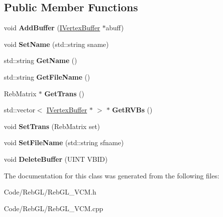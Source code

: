 \subsection*{Public Member Functions}
\begin{DoxyCompactItemize}
\item 
void {\bfseries Add\+Buffer} (\hyperlink{class_i_vertex_buffer}{I\+Vertex\+Buffer} $\ast$abuff)\hypertarget{class_reb_g_l_vertex_cache_a686314c5aea4532365f33ec4d9fef315}{}\label{class_reb_g_l_vertex_cache_a686314c5aea4532365f33ec4d9fef315}

\item 
void {\bfseries Set\+Name} (std\+::string sname)\hypertarget{class_reb_g_l_vertex_cache_abf0e246835945b51ffb3a0460a80af5f}{}\label{class_reb_g_l_vertex_cache_abf0e246835945b51ffb3a0460a80af5f}

\item 
std\+::string {\bfseries Get\+Name} ()\hypertarget{class_reb_g_l_vertex_cache_a6c07f40ae91b8eea6cf0dbcc097105b5}{}\label{class_reb_g_l_vertex_cache_a6c07f40ae91b8eea6cf0dbcc097105b5}

\item 
std\+::string {\bfseries Get\+File\+Name} ()\hypertarget{class_reb_g_l_vertex_cache_acfb783c0667c8ac02ddd2b73975b77a0}{}\label{class_reb_g_l_vertex_cache_acfb783c0667c8ac02ddd2b73975b77a0}

\item 
Reb\+Matrix $\ast$ {\bfseries Get\+Trans} ()\hypertarget{class_reb_g_l_vertex_cache_a411aff7e6b11af38fcca6da51316ad69}{}\label{class_reb_g_l_vertex_cache_a411aff7e6b11af38fcca6da51316ad69}

\item 
std\+::vector$<$ \hyperlink{class_i_vertex_buffer}{I\+Vertex\+Buffer} $\ast$ $>$ $\ast$ {\bfseries Get\+R\+V\+Bs} ()\hypertarget{class_reb_g_l_vertex_cache_a1d8dc5ef13c6441a202f2dfa1050a3d0}{}\label{class_reb_g_l_vertex_cache_a1d8dc5ef13c6441a202f2dfa1050a3d0}

\item 
void {\bfseries Set\+Trans} (Reb\+Matrix set)\hypertarget{class_reb_g_l_vertex_cache_a5ec688da0e7955f079f72fb6402e235f}{}\label{class_reb_g_l_vertex_cache_a5ec688da0e7955f079f72fb6402e235f}

\item 
void {\bfseries Set\+File\+Name} (std\+::string sfname)\hypertarget{class_reb_g_l_vertex_cache_a9cb72d5418723f96b8db2e1882b11905}{}\label{class_reb_g_l_vertex_cache_a9cb72d5418723f96b8db2e1882b11905}

\item 
void {\bfseries Delete\+Buffer} (U\+I\+NT V\+B\+ID)\hypertarget{class_reb_g_l_vertex_cache_a4e3b8c68ae07d70b5f74933519c4f18d}{}\label{class_reb_g_l_vertex_cache_a4e3b8c68ae07d70b5f74933519c4f18d}

\end{DoxyCompactItemize}


The documentation for this class was generated from the following files\+:\begin{DoxyCompactItemize}
\item 
Code/\+Reb\+G\+L/Reb\+G\+L\+\_\+\+V\+C\+M.\+h\item 
Code/\+Reb\+G\+L/Reb\+G\+L\+\_\+\+V\+C\+M.\+cpp\end{DoxyCompactItemize}
